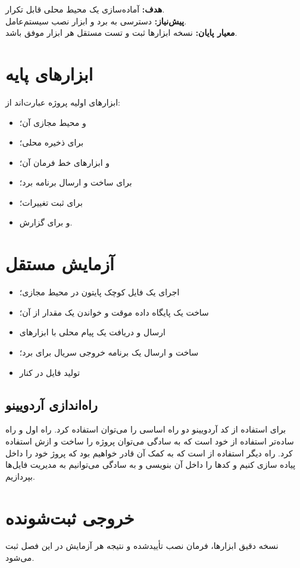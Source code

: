 \begin{phasebox}
\textbf{هدف:} آماده‌سازی یک محیط محلی قابل تکرار.\\
\textbf{پیش‌نیاز:} دسترسی به برد و ابزار نصب سیستم‌عامل.\\
\textbf{معیار پایان:} نسخه ابزارها ثبت و تست مستقل هر ابزار موفق باشد.
\end{phasebox}

\section{ابزارهای پایه}
ابزارهای اولیه پروژه عبارت‌اند از:

\begin{itemize}
    \item
    و محیط مجازی آن؛
    \item
    برای ذخیره محلی؛
    \item
    و ابزارهای خط فرمان آن؛
    \item
    برای ساخت و ارسال برنامه برد؛
    \item
    برای ثبت تغییرات؛
    \item
    و
    برای گزارش.
\end{itemize}

\section{آزمایش مستقل}
\begin{itemize}
    \item اجرای یک فایل کوچک پایتون در محیط مجازی؛
    \item ساخت یک پایگاه داده موقت و خواندن یک مقدار از آن؛
    \item ارسال و دریافت یک پیام محلی با ابزارهای
    \item ساخت و ارسال یک برنامه خروجی سریال برای برد؛
    \item تولید فایل
    در کنار
\end{itemize}


\subsection{راه‌اندازی آردویینو}
برای استفاده از کد آردویینو دو راه اساسی را می‌توان استفاده کرد. راه اول و راه ساده‌تر استفاده از خود 
است که به سادگی می‌توان پروژه را ساخت و ازش استفاده کرد.
راه دیگر استفاده از 
است که به کمک آن قادر خواهیم بود که پروژ خود را داخل 
پیاده سازی کنیم و کدها را داخل آن بنویسی و به سادگی می‌توانیم به مدیریت فایل‌ها بپردازیم.
\section{خروجی ثبت‌شونده}
نسخه دقیق ابزارها، فرمان نصب تأییدشده و نتیجه هر آزمایش در این فصل ثبت می‌شود.
